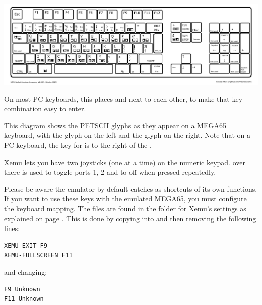\begin{center}
  \includegraphics[width=\linewidth]{images/xemu-extended-keyboard.png}
\end{center}

On most PC keyboards, this places  and  next to each
other, to make that key combination easy to enter.

This diagram shows the PETSCII glyphs as they appear on a MEGA65 keyboard, with the
\megasymbolkey glyph on the left and the  glyph on the right. Note
that on a PC keyboard, the key for \megasymbolkey is to the right of the
.

Xemu lets you have two joysticks (one at a time) on the numeric keypad.
 over there is used to toggle ports 1, 2 and to off when pressed
repeatedly.

Please be aware the emulator by default catches  
 as shortcuts of its own functions. If you want to use these keys with the
emulated MEGA65, you must configure the keyboard mapping. The files are found in the
folder for Xemu's settings as explained on page
\pageref{sec:sdcard-settings-location}. This is done by copying
 into  and then removing the following lines:

\begin{tcolorbox}[colback=black,coltext=white]
\verbatimfont{\codefont}
\begin{verbatim}
XEMU-EXIT F9
XEMU-FULLSCREEN F11
\end{verbatim}
\end{tcolorbox}

and changing:

\begin{tcolorbox}[colback=black,coltext=white]
\verbatimfont{\codefont}
\begin{verbatim}
F9 Unknown
F11 Unknown
\end{verbatim}
\end{tcolorbox}


